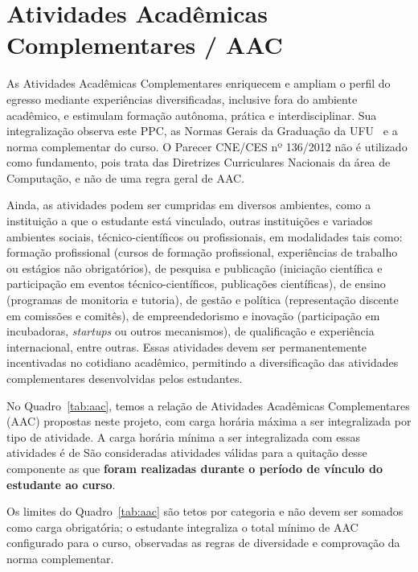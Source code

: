 \section{Atividades Acadêmicas Complementares / AAC}
\label{sec:AAC}

As Atividades Acadêmicas Complementares enriquecem e ampliam o perfil do egresso mediante experiências diversificadas, inclusive fora do ambiente acadêmico, e estimulam formação autônoma, prática e interdisciplinar. Sua integralização observa este PPC, as Normas Gerais da Graduação da UFU~\cite{ufu_congrad_46_2022} e a norma complementar do curso. O Parecer CNE/CES nº 136/2012 não é utilizado como fundamento, pois trata das Diretrizes Curriculares Nacionais da área de Computação, e não de uma regra geral de AAC.

Ainda, as atividades podem ser cumpridas em diversos ambientes, como a instituição a que o estudante está vinculado, outras instituições e variados ambientes sociais, técnico-científicos ou profissionais, em modalidades tais como: formação profissional (cursos de formação profissional, experiências de trabalho ou estágios não obrigatórios), de pesquisa e publicação (iniciação científica e participação em eventos técnico-científicos, publicações científicas), de ensino (programas de monitoria e tutoria), de gestão e política (representação discente em comissões e comitês), de empreendedorismo e inovação (participação em incubadoras, \textit{startups} ou outros mecanismos), de qualificação e experiência internacional, entre outras. Essas atividades devem ser permanentemente incentivadas no cotidiano acadêmico, permitindo a diversificação das atividades complementares desenvolvidas pelos estudantes.

No Quadro~\ref{tab:aac}, temos a relação de Atividades Acadêmicas Complementares (AAC) propostas neste projeto, com carga horária máxima a ser integralizada por tipo de atividade. A carga horária mínima a ser integralizada com essas atividades é de  São consideradas atividades válidas para a quitação desse componente as que \textbf{foram realizadas durante o período de vínculo do estudante ao curso}.

Os limites do Quadro~\ref{tab:aac} são tetos por categoria e não devem ser somados como carga obrigatória; o estudante integraliza o total mínimo de AAC configurado para o curso, observadas as regras de diversidade e comprovação da norma complementar.

